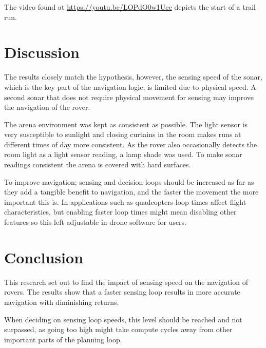 \documentclass[a4paper,12pt,twocolumn]{report}
\begin{document}
The video found at \url{https://youtu.be/LOPdO0w1Uec} depicts the start of a trail run.

\section{Discussion}


The results closely match the hypothesis, however, the sensing speed of the sonar, which is the key part of the navigation logic, is limited due to physical speed. A second sonar that does not require physical movement for sensing may improve the navigation of the rover.

The arena environment was kept as consistent as possible. The light sensor is very susceptible to sunlight and closing curtains in the room makes runs at different times of day more consistent. As the rover also occasionally detects the room light as a light sensor reading, a lamp shade was used. To make sonar readings consistent the arena is covered with hard surfaces.

To improve navigation; sensing and decision loops should be increased as far as they add a tangible benefit to navigation, and the faster the movement the more important this is. In applications such as quadcopters loop times affect flight characteristics, but enabling faster loop times might mean disabling other features so this left adjustable in drone software for users. \citep{betaflight}

\section{Conclusion}


This research set out to find the impact of sensing speed on the navigation of rovers. The results show that a faster sensing loop results in more accurate navigation with diminishing returns.

When deciding on sensing loop speeds, this level should be reached and not surpassed, as going too high might take compute cycles away from other important parts of the planning loop.


\end{document}
